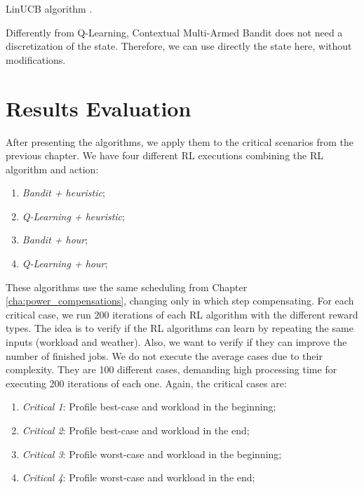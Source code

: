 \IncMargin{1em}
\begin{algorithm}[!htb]
    \footnotesize
    \SetAlgoLined
    \caption{LinUCB algorithm \cite{li2010contextual}.}
    \label{alg:linucb}
\end{algorithm}
\DecMargin{1em}

Differently from Q-Learning, Contextual Multi-Armed Bandit does not need a discretization of the state. Therefore, we can use directly the state here, without modifications.

\section{Results Evaluation}

After presenting the algorithms, we apply them to the critical scenarios from the previous chapter. We have four different RL executions combining the RL algorithm and action: 

\begin{enumerate}
    \item \emph{Bandit + heuristic};
    \item \emph{Q-Learning + heuristic};
    \item \emph{Bandit + hour};
    \item \emph{Q-Learning + hour};
\end{enumerate}

These algorithms use the same scheduling from Chapter \ref{cha:power_compensations}, changing only in which step compensating. For each critical case, we run 200 iterations of each RL algorithm with the different reward types. The idea is to verify if the RL algorithms can learn by repeating the same inputs (workload and weather). Also, we want to verify if they can improve the number of finished jobs. We do not execute the average cases due to their complexity. They are 100 different cases, demanding high processing time for executing 200 iterations of each one. Again, the critical cases are:
\begin{enumerate}
    \item \emph{Critical 1}: Profile best-case and workload in the beginning;
    \item \emph{Critical 2}: Profile best-case and workload in the end;
    \item \emph{Critical 3}: Profile worst-case and workload in the beginning;
    \item \emph{Critical 4}: Profile worst-case and workload in the end;
\end{enumerate}

